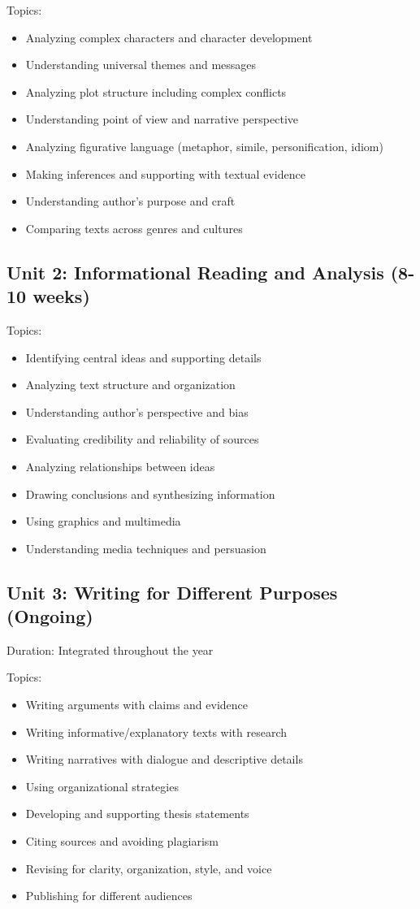 \documentclass[11pt,letterpaper]{report}
\begin{document}
Topics:
\begin{itemize}
\item Analyzing complex characters and character development
\item Understanding universal themes and messages
\item Analyzing plot structure including complex conflicts
\item Understanding point of view and narrative perspective
\item Analyzing figurative language (metaphor, simile, personification, idiom)
\item Making inferences and supporting with textual evidence
\item Understanding author's purpose and craft
\item Comparing texts across genres and cultures
\end{itemize}

\subsection{Unit 2: Informational Reading and Analysis (8-10 weeks)}

Topics:
\begin{itemize}
\item Identifying central ideas and supporting details
\item Analyzing text structure and organization
\item Understanding author's perspective and bias
\item Evaluating credibility and reliability of sources
\item Analyzing relationships between ideas
\item Drawing conclusions and synthesizing information
\item Using graphics and multimedia
\item Understanding media techniques and persuasion
\end{itemize}

\subsection{Unit 3: Writing for Different Purposes (Ongoing)}

Duration: Integrated throughout the year

Topics:
\begin{itemize}
\item Writing arguments with claims and evidence
\item Writing informative/explanatory texts with research
\item Writing narratives with dialogue and descriptive details
\item Using organizational strategies
\item Developing and supporting thesis statements
\item Citing sources and avoiding plagiarism
\item Revising for clarity, organization, style, and voice
\item Publishing for different audiences
\end{itemize}
\end{document}
